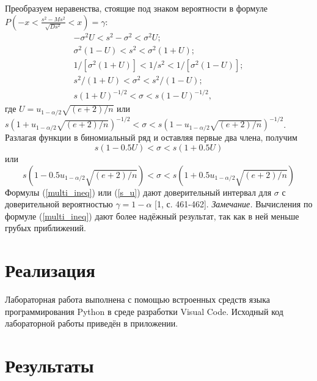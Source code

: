 \documentclass[12pt,a4paper]{scrartcl}
\begin{document}
    Преобразуем неравенства, стоящие под знаком вероятности в формуле
    \newline
    $P\left(-x < \frac{s^{2}-Ms^{2}}{\sqrt{Ds^{2}}} < x\right) = \gamma$:
    \begin{equation}
        \begin{split}
            -\sigma^{2}U < s^{2} -\sigma^{2} < \sigma^{2}U; \\
           \sigma^{2}(1-U) < s^{2} < \sigma^{2}(1 + U); \\
            1/[\sigma^{2}(1 + U)] < 1/s^{2} < 1/[\sigma^{2}(1-U)];\\
            s^{2}/(1 + U) < \sigma^{2} < s^{2}/(1-U);\\
            s(1 + U)^{-1/2} < \sigma < s(1-U)^{-1/2},
        \end{split}
        \label{multi_ineq}
    \end{equation}
    где $U = u_{1-\alpha/2} \sqrt{(e + 2)/n}$ или
    \newline
    $s(1 +  u_{1-\alpha/2}\sqrt{(e + 2)/n})^{-1/2} <\sigma < s(1-u_{1-\alpha/2}\sqrt{(e + 2)/n})^{-1/2}$.
    \newline
    Разлагая функции в биномиальный ряд и оставляя первые два члена, получим
    \begin{equation}
        s(1-0.5U) < \sigma < s(1 + 0.5U)
        \label{s_U}
    \end{equation}
     или
    \begin{equation}
        s(1-0.5u_{1-\alpha/2}\sqrt{(e + 2)/n}) < \sigma < s(1 + 0.5 u_{1-\alpha/2}\sqrt{(e + 2)/n})
        \label{s_u}
    \end{equation}
    Формулы (\ref{multi_ineq}) или (\ref{s_u}) дают доверительный интервал для $\sigma$ с доверительной вероятностью $\gamma = 1-\alpha$ [1, с. 461-462]. 
    \newline
    \textit{Замечание.} Вычисления по формуле (\ref{multi_ineq}) дают более надёжный результат, так как в ней меньше грубых приближений.


\section {Реализация}
Лабораторная работа выполнена с помощью встроенных средств языка программирования Python в среде разработки Visual Code. Исходный код лабораторной работы приведён в приложении.
 
\section{Результаты}
\end{document}
